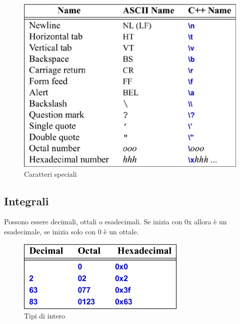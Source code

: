 \documentclass[11pt,a4paper]{book}
\begin{document}
\begin{figure}[h!]
	\begin{center}
		\includegraphics[scale=0.6]{img/009.jpg}
		\caption{Caratteri speciali}
		\label{fig: 009}
	\end{center}
\end{figure}

\subsection{Integrali}
Possono essere decimali, ottali o esadecimali. Se inizia con 0x allora è un esadecimale, se inizia solo con 0 è un ottale.
\begin{figure}[h!]
	\begin{center}
		\includegraphics[scale=0.6]{img/010.jpg}
		\caption{Tipi di intero}
		\label{fig: 010}
	\end{center}
\end{figure}
\end{document}
